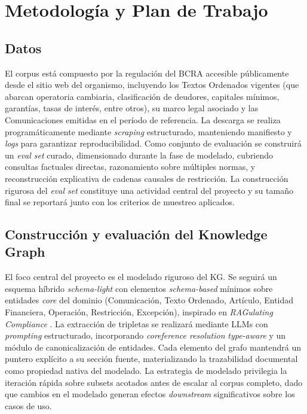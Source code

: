 \documentclass[12pt,a4paper]{article}
\begin{document}
\section{Metodología y Plan de Trabajo}

\subsection{Datos}
El corpus está compuesto por la regulación del BCRA accesible públicamente desde el sitio web del organismo, incluyendo los Textos Ordenados vigentes (que abarcan operatoria cambiaria, clasificación de deudores, capitales mínimos, garantías, tasas de interés, entre otros), su marco legal asociado y las Comunicaciones emitidas en el período de referencia. La descarga se realiza programáticamente mediante \textit{scraping} estructurado, manteniendo manifiesto y \textit{logs} para garantizar reproducibilidad. Como conjunto de evaluación se construirá un \textit{eval set} curado, dimensionado durante la fase de modelado, cubriendo consultas factuales directas, razonamiento sobre múltiples normas, y reconstrucción explicativa de cadenas causales de restricción. La construcción rigurosa del \textit{eval set} constituye una actividad central del proyecto y su tamaño final se reportará junto con los criterios de muestreo aplicados.

\subsection{Construcción y evaluación del Knowledge Graph}
El foco central del proyecto es el modelado riguroso del KG. Se seguirá un esquema híbrido \textit{schema-light} con elementos \textit{schema-based} mínimos sobre entidades \textit{core} del dominio (Comunicación, Texto Ordenado, Artículo, Entidad Financiera, Operación, Restricción, Excepción), inspirado en \textit{RAGulating Compliance} \cite{agarwal2025ragulating}. La extracción de tripletas se realizará mediante LLMs con \textit{prompting} estructurado, incorporando \textit{coreference resolution} \textit{type-aware} \cite{meher2025linkkg} y un módulo de canonicalización de entidades. Cada elemento del grafo mantendrá un puntero explícito a su sección fuente, materializando la trazabilidad documental como propiedad nativa del modelado. La estrategia de modelado privilegia la iteración rápida sobre subsets acotados antes de escalar al corpus completo, dado que cambios en el modelado generan efectos \textit{downstream} significativos sobre los casos de uso.
 
\end{document}
